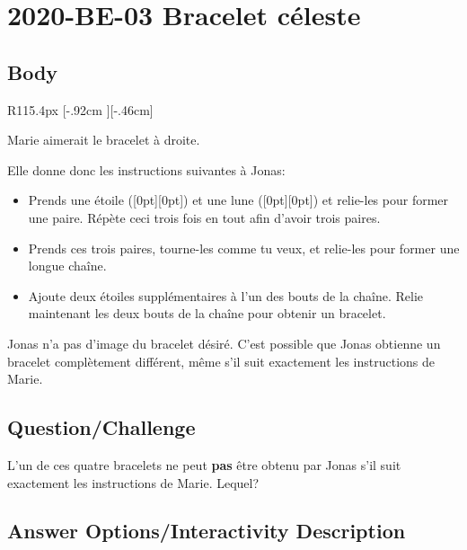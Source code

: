 \documentclass[a4paper,11pt]{report}
\newcommand{\taskGraphicsFolder}{..}
\begin{document}
\section*{\centering{} 2020-BE-03 Bracelet céleste}


\subsection*{Body}

\begin{wrapfigure}{R}{115.4px}
\raisebox{-.46cm}[\dimexpr \height-.92cm \relax][-.46cm]{}
\end{wrapfigure}

Marie aimerait le bracelet à droite.

Elle donne donc les instructions suivantes à Jonas:

\begin{itemize}
  \item Prends une étoile (\raisebox{-0.5ex}[0pt][0pt]{}) et une lune (\raisebox{-0.5ex}[0pt][0pt]{}) et relie-les pour former une paire. Répète ceci trois fois en tout afin d’avoir trois paires.
  \item Prends ces trois paires, tourne-les comme tu veux, et relie-les pour former une longue chaîne.
  \item Ajoute deux étoiles supplémentaires à l’un des bouts de la chaîne. Relie maintenant les deux bouts de la chaîne pour obtenir un bracelet.
\end{itemize}

Jonas n’a pas d’image du bracelet désiré. C’est possible que Jonas obtienne un bracelet complètement différent, même s’il suit exactement les instructions de Marie.

{\em

\subsection*{Question/Challenge}

L’un de ces quatre bracelets ne peut \textbf{pas} être obtenu par Jonas s’il suit exactement les instructions de Marie. Lequel?

}\begingroup
\renewcommand{\arraystretch}{1.5}
\subsection*{Answer Options/Interactivity Description}
\end{document}
